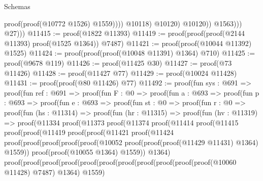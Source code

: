 \begin{lexlean}{Schemas}
\begin{coremodule}
                                      proof(proof(@10772 @1526) @1559))))
                                @10118)
                              @10120)
                            @10120))
                      @1563)))
              @27)))
@11415 := proof(@1822 @11393)
@11419 := proof(proof(proof(@2144 @11393) proof(@1525 @1364)) @7487)
@11421 := proof(proof(@10044 @11392) @1525)
@11424 := proof(proof(proof(@10048 @11391) @1364) @710)
@11425 := proof(@9678 @119)
@11426 := proof(@11425 @30)
@11427 := proof(@73 @11426)
@11428 := proof(@11427 @77)
@11429 := proof(@10024 @11428)
@11431 := proof(proof(@80 @11426) @77)
@11492 := proof(fun {sys : @691} =>
    proof(fun {ref : @691} =>
      proof(fun {F : @0} =>
        proof(fun {a : @693} =>
          proof(fun {p : @693} =>
            proof(fun {e : @693} =>
              proof(fun {st : @0} =>
                proof(fun {r : @0} =>
                  proof(fun (hs : @11314) =>
                    proof(fun (hr : @11315) =>
                      proof(fun (hv : @11319) =>
                        proof(@11334
                            proof(@11373
                                proof(@11374
                                    proof(@11414
                                        proof(@11415
                                            proof(proof(@11419
                                                  proof(proof(@11421
                                                        proof(@11424
                                                            proof(proof(proof(proof(proof(@10052
                                                                        proof(proof(proof(@11429
                                                                                @11431)
                                                                              @1364)
                                                                            @1559))
                                                                      proof(proof(@10055 @1364)
                                                                          @1559))
                                                                    @1364)
                                                                  proof(proof(proof(proof(proof(proof(proof(proof(proof(proof(proof(@10060
                                                                                          @11428)
                                                                                        @7487)
                                                                                      @1364)
                                                                                    @1559)

\end{coremodule}
\end{lexlean}
